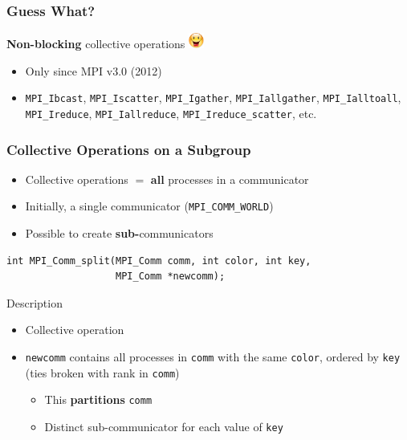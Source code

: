 \documentclass[xcolor={x11names,svgnames,psnames}]{beamer}
\newcommand{\smiley}{\includegraphics[width=0.5cm,trim=0 17mm 0 0]{content}}
\begin{document}

\begin{frame}[fragile=singleslide]
  \frametitle{Guess What?}
  
  \begin{block}{\textbf{Non-blocking} collective operations \smiley}
    \begin{itemize}
    \item Only since MPI v3.0 (2012)
    \item \texttt{MPI_Ibcast}, \texttt{MPI_Iscatter}, \texttt{MPI_Igather}, \texttt{MPI_Iallgather}, \texttt{MPI_Ialltoall}, \texttt{MPI_Ireduce}, \texttt{MPI_Iallreduce}, \texttt{MPI_Ireduce_scatter}, etc.
    \end{itemize}
  \end{block}
\end{frame}


\begin{frame}[fragile=singleslide]
  \frametitle{Collective Operations on a Subgroup}

  \begin{itemize}
  \item Collective operations $=$ \textbf{all} processes in a \alert{communicator}
  \item Initially, a single communicator (\texttt{MPI_COMM_WORLD})
  \item Possible to create \textbf{sub-}communicators
  \end{itemize}
  
\begin{verbatim}
int MPI_Comm_split(MPI_Comm comm, int color, int key,
                   MPI_Comm *newcomm);
\end{verbatim}

  \begin{block}{Description}
    \begin{itemize}
    \item Collective operation
    \item \texttt{newcomm} contains all processes in \texttt{comm} with the same \texttt{color}, ordered by \texttt{key} (ties broken with rank in \texttt{comm})
      \begin{itemize}
      \item This \textbf{partitions} \texttt{comm}
      \item Distinct sub-communicator for each value of \texttt{key}
      \end{itemize}
    \end{itemize}
  \end{block}
\end{frame}
\end{document}
